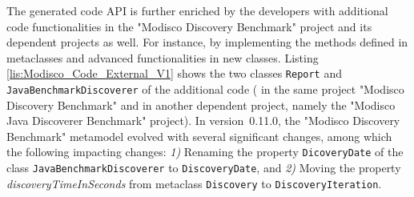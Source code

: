 The generated code API is further enriched by the developers with additional code functionalities in the "Modisco Discovery Benchmark" project and its dependent projects as well.
For instance, by implementing the methods defined in metaclasses and advanced functionalities in new classes.
Listing \ref{lis:Modisco_Code_External_V1} shows the two classes \texttt{Report} and \texttt{JavaBenchmarkDiscoverer} of the additional code ({\small{}} in the same project "Modisco Discovery Benchmark" and in another dependent project, namely the "Modisco Java Discoverer Benchmark" project).
%
%
%
%
In version~0.11.0, the "Modisco Discovery Benchmark" metamodel evolved with several significant changes, among which the following impacting changes: \emph{1)} Renaming the property \texttt{DicoveryDate} of the class  \texttt{JavaBenchmarkDiscoverer} to \texttt{DiscoveryDate}, and \emph{2)} Moving the property \emph{discoveryTimeInSeconds} from metaclass \texttt{Discovery} to \texttt{DiscoveryIteration}.




